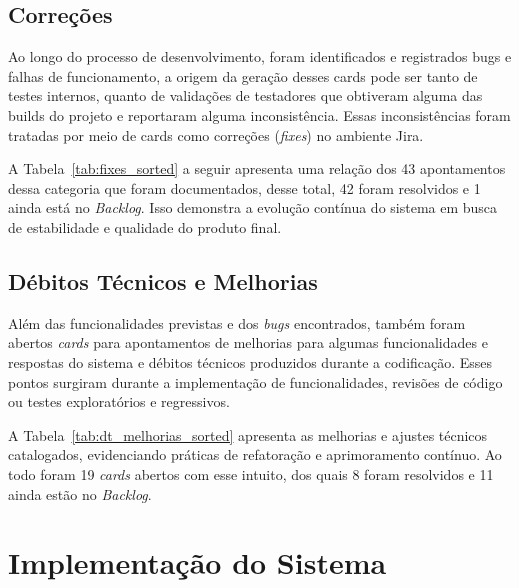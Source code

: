

\subsection{Correções}
Ao longo do processo de desenvolvimento, foram identificados e registrados bugs e falhas 
de funcionamento, a origem da geração desses cards pode ser tanto de testes internos, quanto de 
validações de testadores que obtiveram alguma das builds do projeto e reportaram alguma inconsistência. 
Essas inconsistências foram tratadas por meio de cards como correções (\textit{fixes}) no ambiente Jira.

A Tabela~\ref{tab:fixes_sorted} a seguir apresenta uma relação dos 43 apontamentos dessa categoria que foram documentados, desse total, 
42 foram resolvidos e 1 ainda está no \textit{Backlog}. Isso demonstra a evolução contínua do 
sistema em busca de estabilidade e qualidade do produto final.



\subsection{Débitos Técnicos e Melhorias}
Além das funcionalidades previstas e dos \textit{bugs} encontrados, também foram abertos \textit{cards} 
para apontamentos de melhorias para algumas funcionalidades e respostas do sistema e débitos técnicos produzidos 
durante a codificação. 
Esses pontos surgiram durante a implementação de funcionalidades, revisões de código ou testes 
exploratórios e regressivos.

A Tabela~\ref{tab:dt_melhorias_sorted} apresenta as melhorias e ajustes técnicos catalogados, 
evidenciando práticas de refatoração e aprimoramento contínuo. Ao todo foram 19 \textit{cards} abertos com esse intuito,
dos quais 8 foram resolvidos e 11 ainda estão no \textit{Backlog}.




\section{Implementação do Sistema}

